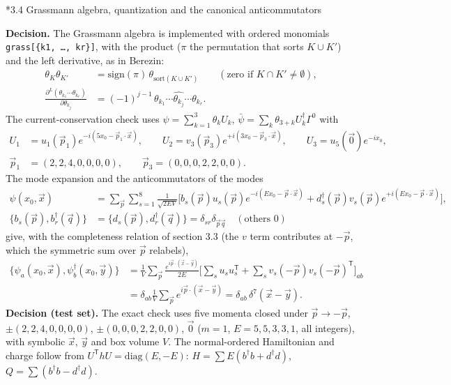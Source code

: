 \documentclass[10pt,a4paper]{article}
\makeatletter
\renewcommand\subsection{\@startsection{subsection}{2}{\z@}{-3.25ex\@plus -1ex \@minus -.2ex}{1.5ex \@plus .2ex}{\normalfont\large\bfseries\raggedright}}
\makeatother
\begin{document}
\subsection*{3.4 Grassmann algebra, quantization and the canonical anticommutators}
\textbf{Decision.} The Grassmann algebra is implemented with ordered monomials \texttt{grass[\{k1, …, kr\}]}, with the product ($\pi$ the permutation that sorts $K\cup K'$) and the left derivative, as in Berezin:
\begin{align*}
\theta_K\theta_{K'}&=\mathrm{sign}(\pi)\,\theta_{\mathrm{sort}(K\cup K')}\qquad(\text{zero if }K\cap K'\neq\emptyset), \\
\frac{\partial^L(\theta_{k_1}\cdots\theta_{k_r})}{\partial\theta_{k_j}}&=(-1)^{j-1}\,\theta_{k_1}\cdots\widehat{\theta_{k_j}}\cdots\theta_{k_r} .
\end{align*}
The current-conservation check uses $\psi=\sum_{k=1}^3\theta_kU_k$, $\bar\psi=\sum_k\theta_{3+k}U_k^\dagger\Gamma^0$ with
\begin{align*}
U_1&=u_1(\vec p_1)e^{-i(5x_0-\vec p_1\cdot\vec x)},\qquad U_2=v_3(\vec p_3)e^{+i(3x_0-\vec p_3\cdot\vec x)},\qquad U_3=u_5(\vec0)e^{-ix_0}, \\
\vec p_1&=(2,2,4,0,0,0,0),\qquad \vec p_3=(0,0,0,2,2,0,0).
\end{align*}
The mode expansion and the anticommutators of the modes
\begin{align*}
\psi(x_0,\vec x)&=\sum_{\vec p}\sum_{s=1}^8\frac1{\sqrt{2EV}}\Big[b_s(\vec p)u_s(\vec p)e^{-i(Ex_0-\vec p\cdot\vec x)}+d_s^\dagger(\vec p)v_s(\vec p)e^{+i(Ex_0-\vec p\cdot\vec x)}\Big], \\
\lbrace b_s(\vec p),b_r^\dagger(\vec q)\rbrace&=\lbrace d_s(\vec p),d_r^\dagger(\vec q)\rbrace=\delta_{sr}\delta_{\vec p\vec q}\quad(\text{others }0)
\end{align*}
give, with the completeness relation of section 3.3 (the $v$ term contributes at $-\vec p$, which the symmetric sum over $\vec p$ relabels),
\begin{align*}
\lbrace\psi_a(x_0,\vec x),\psi_b^\dagger(x_0,\vec y)\rbrace&=\frac1V\sum_{\vec p}\frac{e^{i\vec p\cdot(\vec x-\vec y)}}{2E}\Big[\sum_su_su_s^{\mathsf T}+\sum_sv_s(-\vec p)v_s(-\vec p)^{\mathsf T}\Big]_{ab} \\
&=\delta_{ab}\frac1V\sum_{\vec p}e^{i\vec p\cdot(\vec x-\vec y)}=\delta_{ab}\,\delta^7(\vec x-\vec y).
\end{align*}
\textbf{Decision (test set).} The exact check uses five momenta closed under $\vec p\to-\vec p$, $\pm(2,2,4,0,0,0,0)$, $\pm(0,0,0,2,2,0,0)$, $\vec 0$ ($m=1$, $E=5,5,3,3,1$, all integers), with symbolic $\vec x$, $\vec y$ and box volume $V$. The normal-ordered Hamiltonian and charge follow from $U^{\mathsf T}hU=\mathrm{diag}(E,-E)$: $H=\sum E(b^\dagger b+d^\dagger d)$, $Q=\sum(b^\dagger b-d^\dagger d)$.
\end{document}
